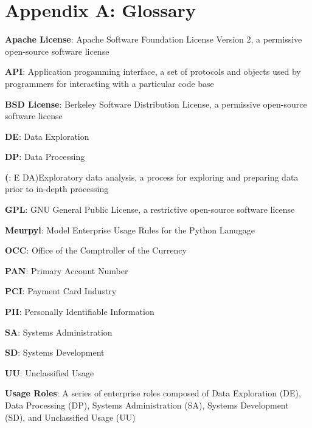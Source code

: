 \newcommand{\definition}[2]{
	\textbf{#1}: #2
}

\section{Appendix A: Glossary}

\thispagestyle{section_start_style}

\vspace*{.3cm}

\setlength{\parskip}{.5em}

    \definition{Apache License}{Apache Software Foundation License Version 2, a permissive open-source software license}

    \definition{API}{Application progamming interface, a set of protocols and objects used by programmers for interacting with a particular code base}

    \definition{BSD License}{Berkeley Software Distribution License, a permissive open-source software license}

	\definition{DE}{Data Exploration}

	\definition{DP}{Data Processing}

	\definition(EDA){Exploratory data analysis, a process for exploring and preparing data prior to in-depth processing}

    \definition{GPL}{GNU General Public License, a restrictive open-source software license}

	\definition{Meurpyl}{Model Enterprise Usage Rules for the Python Lanugage}

	\definition{OCC}{Office of the Comptroller of the Currency}

	\definition{PAN}{Primary Account Number}

	\definition{PCI}{Payment Card Industry}

	\definition{PII}{Personally Identifiable Information}

	\definition{SA}{Systems Administration}

	\definition{SD}{Systems Development}

	\definition{UU}{Unclassified Usage}

	\definition{Usage Roles}{A series of enterprise roles composed of Data Exploration (DE), Data Processing (DP), Systems Administration (SA), Systems Development (SD), and Unclassified Usage (UU)}

\setlength{\parskip}{1em}
